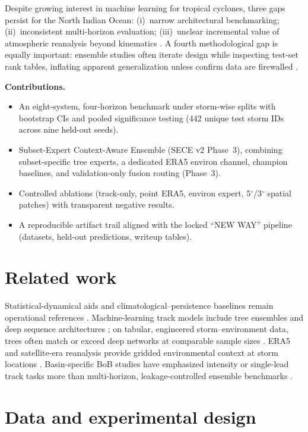 \documentclass[11pt]{article}
\newcommand{\sece}{SECE}
\newcommand{\secefull}{Subset-Expert Context-Aware Ensemble (\sece{} v2 Phase~3)}
\newcommand{\era}{ERA5}
\begin{document}
Despite growing interest in machine learning for tropical cyclones, three gaps persist for the North Indian Ocean: (i)~narrow architectural benchmarking; (ii)~inconsistent multi-horizon evaluation; (iii)~unclear incremental value of atmospheric reanalysis beyond kinematics \cite{prat2021,chan2005,liu2020}.
A fourth methodological gap is equally important: ensemble studies often iterate design while inspecting test-set rank tables, inflating apparent generalization unless confirm data are firewalled \cite{cawley2010,gneiting2014}.

\textbf{Contributions.}
\begin{itemize}
\item An eight-system, four-horizon benchmark under storm-wise splits with bootstrap CIs and pooled significance testing (442 unique test storm IDs across nine held-out seeds).
\item \secefull{}, combining subset-specific tree experts, a dedicated \era{} environ channel, champion baselines, and validation-only fusion routing (Phase~3).
\item Controlled ablations (track-only, point \era{}, environ expert, 5$^\circ$/3$^\circ$ spatial patches) with transparent negative results.
\item A reproducible artifact trail aligned with the locked ``NEW WAY'' pipeline (datasets, held-out predictions, writeup tables).
\end{itemize}

\section{Related work}
Statistical-dynamical aids and climatological--persistence baselines remain operational references \cite{neumann1972,kaplan2003,sampson2018}.
Machine-learning track models include tree ensembles and deep sequence architectures \cite{wu2018,chen2020,lee2021}; on tabular, engineered storm--environment data, trees often match or exceed deep networks at comparable sample sizes \cite{grinsztajn2022,probst2019}.
\era{} and satellite-era reanalysis provide gridded environmental context at storm locations \cite{hersbach2020,velden2006,barnes2013,reichstein2019}.
Basin-specific BoB studies have emphasized intensity or single-lead track tasks more than multi-horizon, leakage-controlled ensemble benchmarks \cite{chan2005,walsh2015}.

\section{Data and experimental design}
\label{sec:data}
\end{document}
